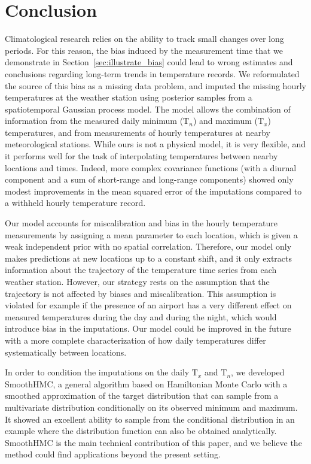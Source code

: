 \documentclass[letter]{article}
\newcommand{\T}{\mathrm{T}}
\newcommand{\Tn}{\T_{n}}
\newcommand{\Tx}{\T_{x}}
\begin{document}
        \section{Conclusion}\label{conclusion}
    


        Climatological research relies on the ability to track small changes over long periods.
For this reason, the bias induced by the measurement time
that we demonstrate in Section~\ref{sec:illustrate_bias}
could lead to wrong estimates and conclusions regarding long-term trends in temperature records.
We reformulated the source of this bias as a missing data problem, and imputed the missing hourly temperatures at the weather station using posterior samples from a spatiotemporal Gaussian process model.
The model allows the combination of information from the measured daily minimum (\(\Tn\)) and maximum (\(\Tx\)) temperatures, and from measurements of hourly temperatures at nearby meteorological stations.
While ours is not a physical model, it is very flexible, and it performs well for the task of interpolating temperatures between nearby locations and times.
Indeed, more complex covariance functions (with a diurnal component and a sum of short-range and long-range components) showed only modest improvements in the mean squared error of the imputations compared to a withheld hourly temperature record.
    


        Our model accounts for miscalibration and bias in the hourly temperature measurements by assigning a mean parameter to each location, which is given a weak independent prior with no spatial correlation.
Therefore, our model only makes predictions at new locations up to a constant shift, and it only extracts information about the trajectory of the temperature time series from each weather station.
However, our strategy rests on the assumption that the trajectory is not affected by biases and miscalibration.
This assumption is violated for example if the presence of an airport has a very different effect on measured temperatures during the day and during the night, which would introduce bias in the imputations.
Our model could be improved in the future with a more complete characterization of how daily temperatures differ systematically between locations.
    


        In order to condition the imputations on the daily \(\Tx\) and \(\Tn\), we developed SmoothHMC, a general algorithm based on Hamiltonian Monte Carlo with a smoothed approximation of the target distribution that can sample from a multivariate distribution conditionally on its observed minimum and maximum.
It showed an excellent ability to sample from the conditional distribution in an example where the distribution function can also be obtained analytically.
SmoothHMC is the main technical contribution of this paper, and we believe the method could find applications beyond the present setting.
\end{document}
